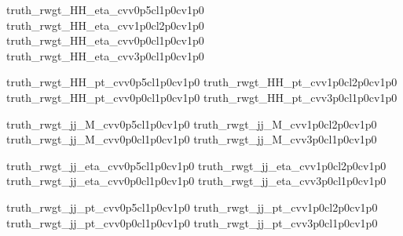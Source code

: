 
{truth_rwgt_HH_eta_cvv0p5cl1p0cv1p0}
{truth_rwgt_HH_eta_cvv1p0cl2p0cv1p0}
{truth_rwgt_HH_eta_cvv0p0cl1p0cv1p0}
{truth_rwgt_HH_eta_cvv3p0cl1p0cv1p0}

{truth_rwgt_HH_pt_cvv0p5cl1p0cv1p0}
{truth_rwgt_HH_pt_cvv1p0cl2p0cv1p0}
{truth_rwgt_HH_pt_cvv0p0cl1p0cv1p0}
{truth_rwgt_HH_pt_cvv3p0cl1p0cv1p0}

{truth_rwgt_jj_M_cvv0p5cl1p0cv1p0}
{truth_rwgt_jj_M_cvv1p0cl2p0cv1p0}
{truth_rwgt_jj_M_cvv0p0cl1p0cv1p0}
{truth_rwgt_jj_M_cvv3p0cl1p0cv1p0}

{truth_rwgt_jj_eta_cvv0p5cl1p0cv1p0}
{truth_rwgt_jj_eta_cvv1p0cl2p0cv1p0}
{truth_rwgt_jj_eta_cvv0p0cl1p0cv1p0}
{truth_rwgt_jj_eta_cvv3p0cl1p0cv1p0}

{truth_rwgt_jj_pt_cvv0p5cl1p0cv1p0}
{truth_rwgt_jj_pt_cvv1p0cl2p0cv1p0}
{truth_rwgt_jj_pt_cvv0p0cl1p0cv1p0}
{truth_rwgt_jj_pt_cvv3p0cl1p0cv1p0}

